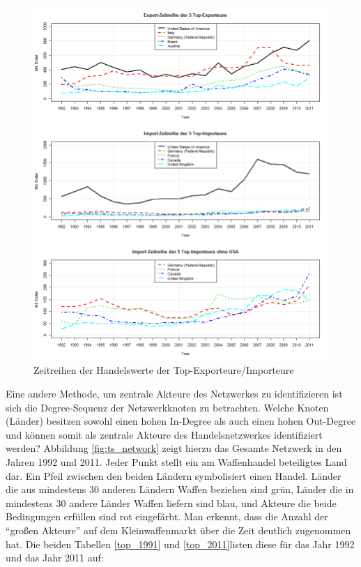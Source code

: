 \documentclass[a4paper,ngerman,oneside,titlepage,bibliography=totoc,11pt]{scrreprt}
\begin{document}
\begin{figure}[h]
	\centering
		\includegraphics[width=1.00\textwidth]{Grafiken/ts_tops.png}
	\caption{Zeitreihen der Handelswerte der Top-Exporteure/Importeure}
	\label{fig:ts_tops}
\end{figure}
Eine andere Methode, um zentrale Akteure des Netzwerkes zu identifizieren ist sich die Degree-Sequenz der Netzwerkknoten zu betrachten. Welche Knoten (Länder) besitzen sowohl einen hohen In-Degree als auch einen hohen Out-Degree und können somit als zentrale Akteure des Handelsnetzwerkes identifiziert werden?
Abbildung \ref{fig:ts_network} zeigt hierzu das Gesamte Netzwerk in den Jahren 1992 und 2011. Jeder Punkt stellt ein am Waffenhandel beteiligtes Land dar. Ein Pfeil zwischen den beiden Ländern symbolisiert einen Handel. Länder die aus mindestens 30 anderen Ländern Waffen beziehen sind grün, Länder die in mindestens 30 andere Länder Waffen liefern sind blau, und Akteure die beide Bedingungen erfüllen sind rot eingefärbt. Man erkennt, dass die Anzahl der "`großen Akteure"' auf dem Kleinwaffenmarkt über die Zeit deutlich zugenommen hat. Die beiden Tabellen \ref{top_1991} und \ref{top_2011}listen diese für das Jahr 1992 und das Jahr 2011 auf:
\end{document}
